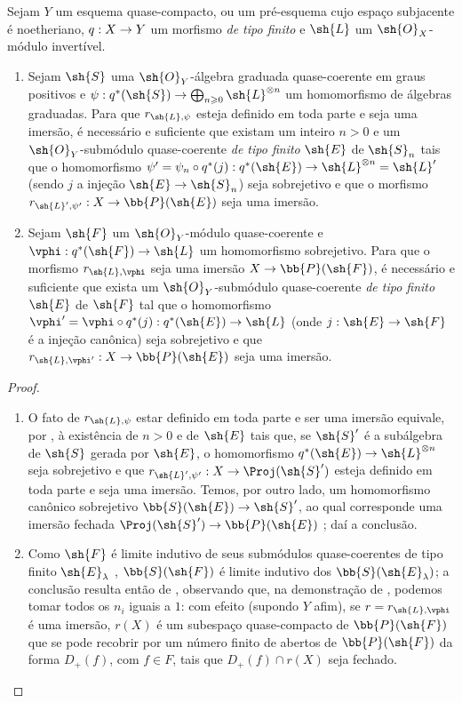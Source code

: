 \documentclass[oneside,10pt]{amsart}
\makeatletter
\renewcommand{\geq}{\geqslant}
\newcommand{\ega@arrow}[2]{\mathchoice{#1}{#2}{#2}{#2}}
\renewcommand{\to}{\ega@arrow{\longrightarrow}{\rightarrow}}
\newcommand{\oldpage}[2][]{\marginnote{\normalfont\footnotesize\textbf{#1}~|~#2}\ignorespaces}
\let\EGAOriginalLabel\label
\renewcommand{\label}[1]{\phantomsection\EGAOriginalLabel{#1}}
\makeatother
\begin{document}
\begin{proposition}[4.4.1]
\label{II.4.4.1}
Sejam $Y$ um esquema quase-compacto, ou um pré-esquema cujo espaço subjacente é noetheriano, $q:X\to Y$ um morfismo \emph{de tipo finito} e $\sh{L}$ um $\sh{O}_X$-módulo invertível.
\begin{enumerate}
  \item[\rm{(i)}] Sejam $\sh{S}$ uma $\sh{O}_Y$-álgebra graduada quase-coerente em graus positivos e $\psi:q^*(\sh{S})\to\bigoplus_{n\geq0}\sh{L}^{\otimes n}$ um homomorfismo de álgebras graduadas.
    Para que $r_{\sh{L},\psi}$ esteja definido em toda parte e seja uma imersão, é necessário e
\oldpage[II]{79}
suficiente que existam um inteiro $n>0$ e um $\sh{O}_Y$-submódulo quase-coerente \emph{de tipo finito} $\sh{E}$ de $\sh{S}_n$ tais que o homomorfismo $\psi'=\psi_n\circ q^*(j):q^*(\sh{E})\to\sh{L}^{\otimes n}=\sh{L}'$ (sendo $j$ a injeção $\sh{E}\to\sh{S}_n$) seja sobrejetivo e que o morfismo $r_{\sh{L}',\psi'}:X\to\bb{P}(\sh{E})$ seja uma imersão.
  \item[\rm{(ii)}] Sejam $\sh{F}$ um $\sh{O}_Y$-módulo quase-coerente e $\vphi:q^*(\sh{F})\to\sh{L}$ um homomorfismo sobrejetivo.
    Para que o morfismo $r_{\sh{L},\vphi}$ seja uma imersão $X\to\bb{P}(\sh{F})$, é necessário e suficiente que exista um $\sh{O}_Y$-submódulo quase-coerente \emph{de tipo finito} $\sh{E}$ de $\sh{F}$ tal que o homomorfismo $\vphi'=\vphi\circ q^*(j):q^*(\sh{E})\to\sh{L}$ (onde $j:\sh{E}\to\sh{F}$ é a injeção canônica) seja sobrejetivo e que $r_{\sh{L},\vphi'}:X\to\bb{P}(\sh{E})$ seja uma imersão.
\end{enumerate}
\end{proposition}

\begin{proof}
\medskip\noindent
\begin{enumerate}
  \item[\rm{(i)}] O fato de $r_{\sh{L},\psi}$ estar definido em toda parte e ser uma imersão equivale, por , à existência de $n>0$ e de $\sh{E}$ tais que, se $\sh{S}'$ é a subálgebra de $\sh{S}$ gerada por $\sh{E}$, o homomorfismo $q^*(\sh{E})\to\sh{L}^{\otimes n}$ seja sobrejetivo e que $r_{\sh{L}',\psi'}:X\to\Proj(\sh{S}')$ esteja definido em toda parte e seja uma imersão.
    Temos, por outro lado, um homomorfismo canônico sobrejetivo $\bb{S}(\sh{E})\to\sh{S}'$, ao qual corresponde uma imersão fechada $\Proj(\sh{S}')\to\bb{P}(\sh{E})$ ;
    daí a conclusão.
  \item[\rm{(ii)}] Como $\sh{F}$ é limite indutivo de seus submódulos quase-coerentes de tipo finito $\sh{E}_\lambda$ , $\bb{S}(\sh{F})$ é limite indutivo dos $\bb{S}(\sh{E}_\lambda)$;
    a conclusão resulta então de , observando que, na demonstração de , podemos tomar todos os $n_i$ iguais a $1$:
    com efeito (supondo $Y$ afim), se $r=r_{\sh{L},\vphi}$ é uma imersão, $r(X)$ é um subespaço quase-compacto de $\bb{P}(\sh{F})$ que se pode recobrir por um número finito de abertos de $\bb{P}(\sh{F})$ da forma $D_+(f)$, com $f\in F$, tais que $D_+(f)\cap r(X)$ seja fechado.
\end{enumerate}
\end{proof}
\end{document}
